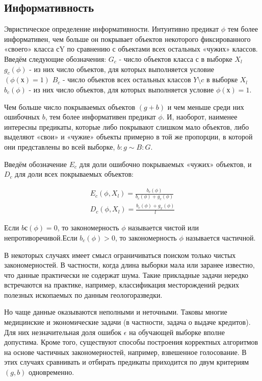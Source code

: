 \subsection{Информативность}

Эвристическое определение информативности. Интуитивно предикат $\phi$ тем более информативен, чем больше он покрывает объектов некоторого фиксированного «своего» класса сY по сравнению с объектами всех остальных «чужих» классов. Введём следующие обозначения:
$G_c$ - число объектов класса с в выборке $X_l$
$g_c(\phi)$ - из них число объектов, для которых выполняется условие $(\phi(х) = 1)$
$B_c$ - число объектов всех остальных классов $Y \setminus {c}$ в выборке $X_l$
$b_c(\phi)$ -  из них число объектов, для которых выполняется условие $\phi(х) = 1$.

Чем   больше   число   покрываемых объектов $(g+b)$ и чем меньше среди них ошибочных $b$, тем более информативен предикат $\phi$. И, наоборот, наименее интересны предикаты, которые либо покрывают слишком мало объектов, либо выделяют «свои» и «чужие» объекты примерно в той же пропорции, в которой они представлены во всей выборке, $b:g \sim B:G$.

Введём обозначение $E_c$ для доли ошибочно покрываемых «чужих» объектов, и $D_c$ для доли всех покрываемых объектов:

\begin{subequations}
\begin{align}
	E_c(\phi,X_l)=\frac{b_c(\phi)}{b_c(\phi)+g_c(\phi)} \\
	D_c(\phi,X_l)=\frac{b_c(\phi)+g_x(\phi)}{l}
\end{align}
\end{subequations}

Если $bс(\phi)=0$, то закономерность $\phi$ называется чистой или непротиворечивой.Если $b_c(\phi)>0$, то закономерность $\phi$ называется частичной.

В некоторых случаях имеет смысл ограничиваться поиском только чистых закономерностей. В частности, когда длина выборки мала или заранее известно, что данные практически не содержат шума. Такие прикладные задачи нередко встречаются на практике, например, классификация месторождений редких полезных ископаемых по данным геологоразведки.

Но чаще данные оказываются неполными и неточными. Таковы многие медицинские и экономические задачи (в частности, задача о выдаче кредитов). Для них незначительная доля ошибок $\epsilon$ на обучающей выборке вполне допустима. Кроме того, существуют способы построения корректных алгоритмов на основе частичных закономерностей, например, взвешенное голосование. В этих случаях сравнивать и отбирать предикаты приходится по двум критериям $(g,b)$ одновременно.

